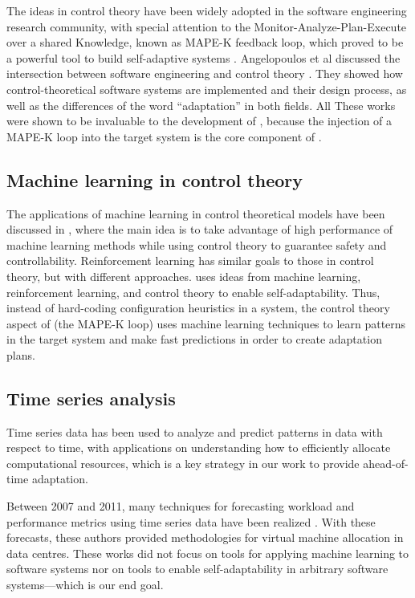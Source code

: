 The ideas in control theory have been widely adopted in the software engineering research community, with special attention to the Monitor-Analyze-Plan-Execute over a shared Knowledge, known as MAPE-K feedback loop, which proved to be a powerful tool to build self-adaptive systems \cite{arcaini_modeling_2015, salehie_self-adaptive_2009, Brun2013, computing_architectural_2006, kephart_vision_2003, de_lemos_software_2013}. Angelopoulos et al discussed the intersection between software engineering and control theory \cite{filieri2015software}. They showed how control-theoretical software systems are implemented and their design process, as well as the differences of the word ``adaptation'' in both fields. All These works were shown to be invaluable to the development of \projectname{}, because the injection of a MAPE-K loop into the target system is the core component of \projectname{}.

\subsection{Machine learning in control theory}

The applications of machine learning in control theoretical models have been discussed in \cite{Gillula10_FusingMachineLearningControlTheory}, where the main idea is to take advantage of high performance of machine learning methods while using control theory to guarantee safety and controllability. Reinforcement learning \cite{Sutton:1998:IRL:551283} has similar goals to those in control theory, but with different approaches. \projectname{} uses ideas from machine learning, reinforcement learning, and control theory to enable self-adaptability. Thus, instead of hard-coding configuration heuristics in a system, the control theory aspect of \projectname{} (the MAPE-K loop) uses machine learning techniques to learn patterns in the target system and make fast predictions in order to create adaptation plans.

\subsection{Time series analysis}

Time series data has been used to analyze and predict patterns in data with respect to time, with applications on understanding how to efficiently allocate computational resources, which is a key strategy in our work to provide ahead-of-time adaptation.

Between 2007 and 2011, many techniques for forecasting workload and performance metrics using time series data have been realized \cite{gmach2007workload, towards_autonomic_allocation, bobroff2007dynamic, meng2010efficient, caron2011pattern}. With these forecasts, these authors provided methodologies for virtual machine allocation in data centres. These works did not focus on tools for applying machine learning to software systems nor on tools to enable self-adaptability in arbitrary software systems---which is our end goal.

